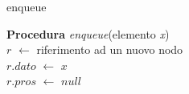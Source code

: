 \begin{algorithm}
    \caption{enqueue}
    \Indm\textbf{Procedura} \emph{enqueue}(elemento \emph{x})\\
    \Indp$r$ $\leftarrow$ riferimento ad un nuovo nodo\\
    $r.dato$ $\leftarrow$ $x$\\
    $r.pros$ $\leftarrow$ $null$\\
    
\end{algorithm}


\clearpage